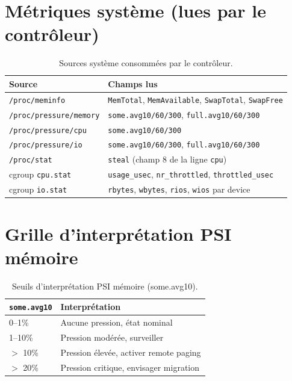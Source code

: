 \section{Métriques système (lues par le contrôleur)}

\begin{table}[H]
\centering
\small
\caption{Sources système consommées par le contrôleur.}
\begin{tabular}{lp{8.5cm}}
\toprule
\textbf{Source} & \textbf{Champs lus} \\
\midrule
\texttt{/proc/meminfo}        & \texttt{MemTotal}, \texttt{MemAvailable}, \texttt{SwapTotal}, \texttt{SwapFree} \\
\texttt{/proc/pressure/memory}& \texttt{some.avg10/60/300}, \texttt{full.avg10/60/300} \\
\texttt{/proc/pressure/cpu}   & \texttt{some.avg10/60/300} \\
\texttt{/proc/pressure/io}    & \texttt{some.avg10/60/300}, \texttt{full.avg10/60/300} \\
\texttt{/proc/stat}           & \texttt{steal} (champ 8 de la ligne \texttt{cpu}) \\
cgroup \texttt{cpu.stat}      & \texttt{usage\_usec}, \texttt{nr\_throttled}, \texttt{throttled\_usec} \\
cgroup \texttt{io.stat}       & \texttt{rbytes}, \texttt{wbytes}, \texttt{rios}, \texttt{wios} par device \\
\bottomrule
\end{tabular}

\end{table}

\section{Grille d'interprétation PSI mémoire}

\begin{table}[H]
\centering
\small
\caption{Seuils d'interprétation PSI mémoire (some.avg10).}
\begin{tabular}{ll}
\toprule
\textbf{\texttt{some.avg10}} & \textbf{Interprétation} \\
\midrule
0--1\%       & Aucune pression, état nominal \\
1--10\%      & Pression modérée, surveiller \\
$>$ 10\%     & Pression élevée, activer remote paging \\
$>$ 20\%     & Pression critique, envisager migration \\
\bottomrule
\end{tabular}

\end{table}
